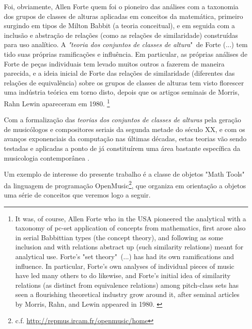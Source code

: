 \documentclass[
	12pt,				%
	openright,			%
	twoside,			%
	a4paper,			%
	english,			%
	french,				%
	spanish,			%
	brazil				%
	]{abntex2}
\begin{document}
\begin{citacao}
Foi, obviamente, Allen Forte quem foi o pioneiro das análises com a taxonomia dos grupos de classes de alturas aplicadas em conceitos da matemática, primeiro surgindo em tipos de Milton Babbit (a teoria conceitual), e em seguida com a inclusão e abstração de relações (como as relações de similaridade) construídas para uso analítico. A \textit{"teoria dos conjuntos de classes de altura}"\ de Forte (...) tem tido suas próprias ramificações e influência. Em particular, as próprias análises de Forte de peças individuais tem levado muitos outros a fazerem de maneira parecida, e a ideia inicial de Forte das relações de similaridade (diferentes das relações de equivalência) sobre os grupos de classes de alturas tem visto florescer uma indústria teórica em torno disto, depois que os artigos seminais de Morris, Rahn  Lewin apareceram em 1980. \cite[ p. 130]{rahn2004swerve}\footnote{
It was, of course, Allen Forte who in the USA pioneered the analytical with a taxonomy of pc-set application of concepts from mathematics, first arose also in serial Babbittian types (the concept theory), and following as some inclusion and with relations abstract up (such similarity relations) meant for analytical use. Forte's "set theory"\  (...) has had its own ramifications and influence. In particular, Forte's own analyses of individual pieces of music have led many others to do likewise, and Forte's initial idea of similarity relations (as distinct from equivalence relations) among pitch-class sets has seen a flourishing theoretical industry grow around it, after seminal articles by Morris, Rahn, and Lewin appeared in 1980. \cite[ p. 130]{rahn2004swerve}}
\end{citacao}




Com a formalização das \textit{teorias dos conjuntos de classes de alturas} pela geração de musicólogos e compositores seriais da segunda metade do século XX, e com os avanços exponenciais da computação nas últimas décadas, estas teorias vão sendo testadas e aplicadas a ponto de já constituírem uma área bastante específica da musicologia contemporânea \cite{aroundset2013}.

Um exemplo de interesse do presente trabalho é a classe de objetos "Math Tools"\ \cite{andreatta2003implementing,AndreataOMtutorial,DebrilOM} da linguagem de programação OpenMusic\footnote{c.f. \url{http://repmus.ircam.fr/openmusic/home}}, que organiza em orientação a objetos uma série de conceitos que veremos logo a seguir. 
\end{document}
